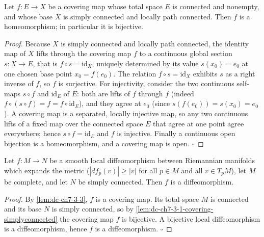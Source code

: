 \begin{lemma}
  \label{lem:dc-ch7-3-1-covering-simplyconnected}
  \leanok
  Let $f:E\to X$ be a covering map whose total space $E$ is connected and nonempty,
  and whose base $X$ is simply connected and locally path connected. Then $f$ is a
  homeomorphism; in particular it is bijective.
\end{lemma}
\begin{proof}
  \leanok
  Because $X$ is simply connected and locally path connected, the identity map of
  $X$ lifts through the covering map $f$ to a continuous global section $s:X\to E$,
  that is $f\circ s=\mathrm{id}_X$, uniquely determined by its value $s(x_0)=e_0$ at
  one chosen base point $x_0=f(e_0)$. The relation $f\circ s=\mathrm{id}_X$ exhibits
  $s$ as a right inverse of $f$, so $f$ is surjective. For injectivity, consider the
  two continuous self-maps $s\circ f$ and $\mathrm{id}_E$ of $E$: both are lifts of
  $f$ through $f$ (indeed $f\circ(s\circ f)=f=f\circ\mathrm{id}_E$), and they agree at
  $e_0$ (since $s(f(e_0))=s(x_0)=e_0$). A covering map is a separated, locally
  injective map, so any two continuous lifts of a fixed map over the connected space
  $E$ that agree at one point agree everywhere; hence $s\circ f=\mathrm{id}_E$ and $f$
  is injective. Finally a continuous open bijection is a homeomorphism, and a covering
  map is open. $\square$
\end{proof}

\begin{lemma}
  \label{lem:dc-ch7-3-1-covering-diffeo}
  \leanok
  Let $f:M\to N$ be a smooth local diffeomorphism between Riemannian manifolds which
  expands the metric ($|df_p(v)|\ge|v|$ for all $p\in M$ and all $v\in T_pM$), let $M$
  be complete, and let $N$ be simply connected. Then $f$ is a diffeomorphism.
\end{lemma}
\begin{proof}
  \leanok
  By \cref{lem:dc-ch7-3-3}, $f$ is a covering map. Its total space $M$ is connected
  and its base $N$ is simply connected, so by
  \cref{lem:dc-ch7-3-1-covering-simplyconnected} the covering map $f$ is bijective.
  A bijective local diffeomorphism is a diffeomorphism, hence $f$ is a
  diffeomorphism. $\square$
\end{proof}

